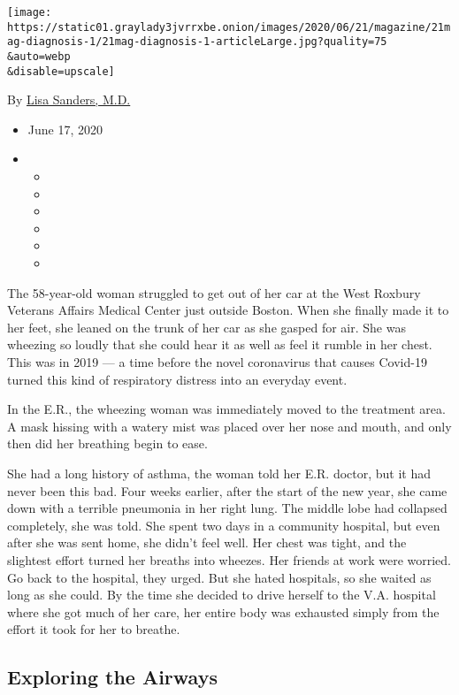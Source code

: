 \texttt{[image: https://static01.graylady3jvrrxbe.onion/images/2020/06/21/magazine/21mag-diagnosis-1/21mag-diagnosis-1-articleLarge.jpg?quality=75\\\&auto=webp\\\&disable=upscale]}

By \href{https://www.nytimes3xbfgragh.onion/by/lisa-sanders-md}{Lisa
Sanders, M.D.}

\begin{itemize}
\item
  June 17, 2020
\item
  \begin{itemize}
  \item
  \item
  \item
  \item
  \item
  \item
  \end{itemize}
\end{itemize}

The 58-year-old woman struggled to get out of her car at the West
Roxbury Veterans Affairs Medical Center just outside Boston. When she
finally made it to her feet, she leaned on the trunk of her car as she
gasped for air. She was wheezing so loudly that she could hear it as
well as feel it rumble in her chest. This was in 2019 --- a time before
the novel coronavirus that causes Covid-19 turned this kind of
respiratory distress into an everyday event.

In the E.R., the wheezing woman was immediately moved to the treatment
area. A mask hissing with a watery mist was placed over her nose and
mouth, and only then did her breathing begin to ease.

She had a long history of asthma, the woman told her E.R. doctor, but it
had never been this bad. Four weeks earlier, after the start of the new
year, she came down with a terrible pneumonia in her right lung. The
middle lobe had collapsed completely, she was told. She spent two days
in a community hospital, but even after she was sent home, she didn't
feel well. Her chest was tight, and the slightest effort turned her
breaths into wheezes. Her friends at work were worried. Go back to the
hospital, they urged. But she hated hospitals, so she waited as long as
she could. By the time she decided to drive herself to the V.A. hospital
where she got much of her care, her entire body was exhausted simply
from the effort it took for her to breathe.

\hypertarget{exploring-the-airways}{%
\subsection{\texorpdfstring{\textbf{Exploring the
Airways}}{Exploring the Airways}}\label{exploring-the-airways}}

